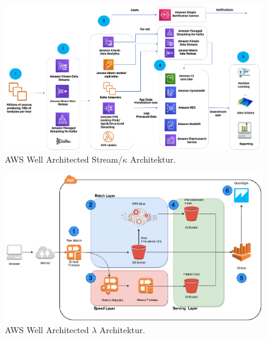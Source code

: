 \begin{figure}[H]
\centering
\includegraphics[width=0.92\textheight,angle=90,origin=c]{graphics/AWS-Stream-Architecture.pdf}
\caption[AWS Well Architected Stream/$\kappa$ Architektur]{AWS Well Architected Stream/$\kappa$ Architektur.\footnotemark}
\label{abb:AWSWellArchitectedStream}
\end{figure}

\begin{figure}[H]
\centering
\includegraphics[width=0.92\textheight,angle=90,origin=c]{graphics/AWS-Lambda-Architecture.pdf}
\caption[AWS Well Architected $\lambda$ Architektur]{AWS Well Architected $\lambda$ Architektur.\footnotemark}
\label{abb:AWSWellArchitectedLambda}
\end{figure}










% 

